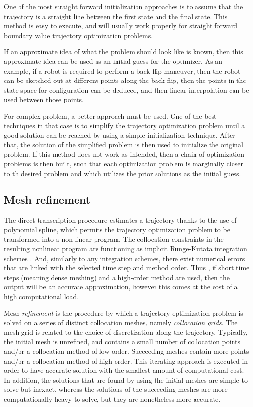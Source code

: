 \documentclass{thesisreport}
\begin{document}
One of the most straight forward initialization approaches is to assume that the trajectory is a straight line between the first state and the final state. This method is easy to execute, and will usually work properly for straight forward boundary value trajectory optimization problems.

If an approximate idea of what the problem should look like is known, then this approximate idea can be used as an initial guess for the optimizer. As an example, if a robot is required to perform a back-flip maneuver, then the robot can be sketched out at different points along the back-flip, then the points in the state-space for configuration can be deduced, and then linear interpolation can be used between those points. 

For complex problem, a better approach must be used.  One of the best techniques in that case is to simplify the trajectory optimization problem until a good solution can be reached by using a simple initialization technique. After that, the solution of the simplified problem is then used to initialize the original problem. If this method does not work as intended, then a chain of optimization problems is then built, such that each optimization problem is marginally closer to th desired problem and which utilizes the prior solutions as the initial guess.

\subsection{Mesh refinement}

The direct transcription procedure estimates a trajectory thanks to the use of polynomial spline, which permits the trajectory optimization problem to be transformed into a non-linear program. The collocation constraints in the resulting nonlinear program are functioning as implicit Runge-Kutata integration schemes \cite{Betts2010}. And, similarly to any integration schemes, there exist numerical errors that are linked with the selected time step and method order. Thus , if short time steps (meaning dense meshing) and a high-order method are used, then the output will be an accurate approximation, however this comes at the cost of a high computational load.


Mesh \textit{refinement} is the procedure by which a trajectory optimization problem is solved on a series of distinct collocation meshes, namely \textit{collocation grids}. The mesh grid is related to the choice of discretization along the trajectory. Typically, the initial mesh is unrefined, and contains a small number of collocation points and/or a collocation method of low-order. Succeeding meshes contain more points and/or a collocation method of high-order. This iterating approach is executed in order to have accurate solution with the smallest amount of computational cost. In addition, the solutions that are found by using the initial meshes are simple to solve but inexact, whereas the solutions of the succeeding meshes are more computationally heavy to solve, but they are nonetheless more accurate.
\end{document}
